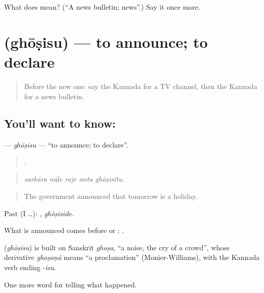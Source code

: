 \begin{tcolorbox}[breakable,colback=teal!4,colframe=teal!35!black,title={Before you move on}]
What does  mean? (\textquotedblleft{}A news bulletin; news\textquotedblright{}.) Say it once more.
\end{tcolorbox}
\section[\texorpdfstring{\kn{ಘೋಷಿಸು} (ghōṣisu)}{ಘೋಷಿಸು (ghōṣisu)}]{ (ghōṣisu) — to announce; to declare}

\label{lesson:KA-C329-ghosisu}



\begin{quote}
Before the new one: say the Kannada for a TV channel, then the Kannada for a news bulletin.
\end{quote}

\subsection*{You'll want to know: }
\textbf{} — \emph{ghōṣisu} — \textquotedblleft{}to announce; to declare\textquotedblright{}.

\begin{quote}
    .
\end{quote}

\begin{quote}
\emph{sarkāra nāḷe raje anta ghōṣisitu.}
\end{quote}

\begin{quote}
The government announced that tomorrow is a holiday.
\end{quote}

Past (I …): , \emph{ghōṣiside}.

What is announced comes before  or :   .

\begin{cousinweb}
\textbf{} (\emph{ghōṣisu}) is built on Sanskrit \emph{ghoṣa}, \textquotedblleft{}a noise, the cry of a crowd\textquotedblright{}, whose derivative \emph{ghoṣaṇā} means \textquotedblleft{}a proclamation\textquotedblright{} (Monier-Williams), with the Kannada verb ending -\emph{isu}.
\end{cousinweb}

\begin{grammarlens}[title={What you've built}]
One more word for telling what happened.
\end{grammarlens}

